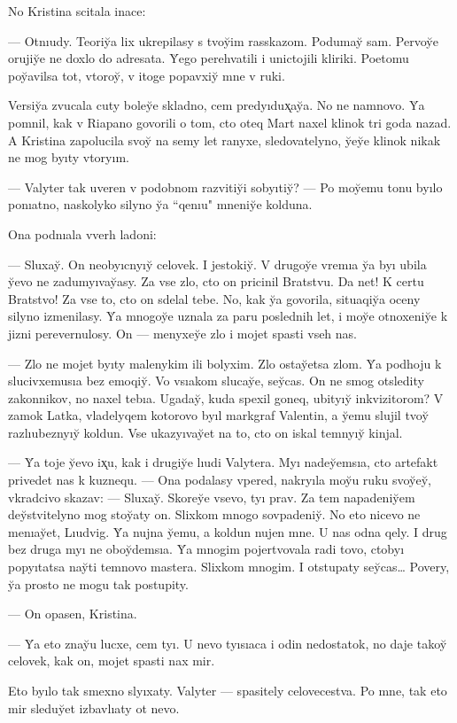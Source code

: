 \documentclass[10pt]{book}
\begin{document}
No Kristina scitala inace:

— Otnıudy. Teoriy̆a lix ukrepilasy s tvoy̆im rasskazom. Podumay̆ sam. Pervoy̆e orujiy̆e ne doxlo do adresata. Y̆ego perehvatili i unictojili kliriki. Poetomu poy̆avilsa tot, vtoroy̆, v itoge popavxiy̆ mne v ruki.

Versiy̆a zvucala cuty boley̆e skladno, cem predyıdux̨ay̆a. No ne namnovo. Y̆a pomnil, kak v Riapano govorili o tom, cto oteq Mart naxel klinok tri goda nazad. A Kristina zapolucila svoy̆ na semy let ranyxe, sledovatelyno, y̆ey̆e klinok nikak ne mog byıty vtoryım.

— Valyter tak uveren v podobnom razvitiy̆i sobyıtiy̆? — Po moy̆emu tonu byılo ponıatno, naskolyko silyno y̆a ``qenıu" mneniy̆e kolduna.

Ona podnıala vverh ladoni:

— Sluxay̆. On neobyıcnyıy̆ celovek. I jestokiy̆. V drugoy̆e vremıa y̆a byı ubila y̆evo ne zadumyıvay̆asy. Za vse zlo, cto on pricinil Bratstvu. Da net! K certu Bratstvo! Za vse to, cto on sdelal tebe. No, kak y̆a govorila, situaqiy̆a oceny silyno izmenilasy. Y̆a mnogoy̆e uznala za paru poslednih let, i moy̆e otnoxeniy̆e k jizni perevernulosy. On — menyxey̆e zlo i mojet spasti vseh nas.

— Zlo ne mojet byıty malenykim ili bolyxim. Zlo ostay̆etsa zlom. Y̆a podhoju k slucivxemusıa bez emoqiy̆. Vo vsıakom slucay̆e, sey̆cas. On ne smog otsledity zakonnikov, no naxel tebıa. Ugaday̆, kuda spexil goneq, ubityıy̆ inkvizitorom? V zamok Latka, vladelyqem kotorovo byıl markgraf Valentin, a y̆emu slujil tvoy̆ razlıubeznyıy̆ koldun. Vse ukazyıvay̆et na to, cto on iskal temnyıy̆ kinjal.

— Y̆a toje y̆evo ix̨u, kak i drugiy̆e lıudi Valytera. Myı nadey̆emsıa, cto artefakt privedet nas k kuznequ. — Ona podalasy vpered, nakryıla moy̆u ruku svoy̆ey̆, vkradcivo skazav: — Sluxay̆. Skorey̆e vsevo, tyı prav. Za tem napadeniy̆em dey̆stvitelyno mog stoy̆aty on. Slixkom mnogo sovpadeniy̆. No eto nicevo ne menıay̆et, Lıudvig. Y̆a nujna y̆emu, a koldun nujen mne. U nas odna qely. I drug bez druga myı ne oboy̆demsıa. Y̆a mnogim pojertvovala radi tovo, ctobyı popyıtatsa nay̆ti temnovo mastera. Slixkom mnogim. I otstupaty sey̆cas… Povery, y̆a prosto ne mogu tak postupity.

— On opasen, Kristina.

— Y̆a eto znay̆u lucxe, cem tyı. U nevo tyısıaca i odin nedostatok, no daje takoy̆ celovek, kak on, mojet spasti nax mir.

Eto byılo tak smexno slyıxaty. Valyter — spasitely celovecestva. Po mne, tak eto mir sleduy̆et izbavlıaty ot nevo.
\end{document}
